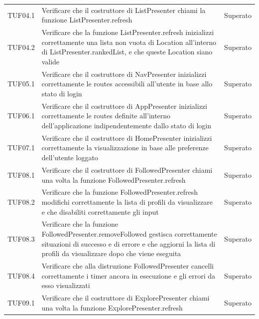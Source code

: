 {\begin{longtable}{C{.3\freewidth} C{.5\freewidth} C{.3\freewidth}}
        TUF04.1 & Verificare che il costruttore di ListPresenter chiami la funzione ListPresenter.refresh & Superato \\

        TUF04.2 & Verificare che la funzione ListPresenter.refresh inizializzi correttamente una lista non vuota di Location all'interno di ListPresenter.rankedList, 
                e che queste Location siano valide & Superato \\
        
        TUF05.1 & Verificare che il costruttore di NavPresenter inizializzi correttamente le routes accessibili all'utente in base allo 
                stato di login & Superato \\
        
        TUF06.1 & Verificare che il costruttore di AppPresenter inizializzi correttamente le routes definite all'interno dell'applicazione 
                indipendentemente dallo stato di login & Superato \\

        TUF07.1 & Verificare che il costruttore di HomePresenter inizializzi correttamente la visualizzazione in base alle preferenze 
                dell'utente loggato & Superato \\

        TUF08.1 & Verificare che il costruttore di FollowedPresenter chiami una volta la funzione FollowedPresenter.refresh & Superato \\

        TUF08.2 & Verificare che la funzione FollowedPresenter.refresh modifichi correttamente la lista di profili da visualizzare 
                e che disabiliti correttamente gli input & Superato \\

        TUF08.3 & Verificare che la funzione FollowedPresenter.removeFollowed gestisca correttamente situazioni di successo 
                e di errore e che aggiorni la lista di profili da visualizzare dopo che viene eseguita & Superato \\

        TUF08.4 & Verificare che alla distruzione FollowedPresenter cancelli correttamente i timer ancora in esecuzione 
                e gli errori da esso visualizzati & Superato \\

        TUF09.1 & Verificare che il costruttore di ExplorePresenter chiami una volta la funzione ExplorePresenter.refresh & Superato \\


\end{longtable}}
